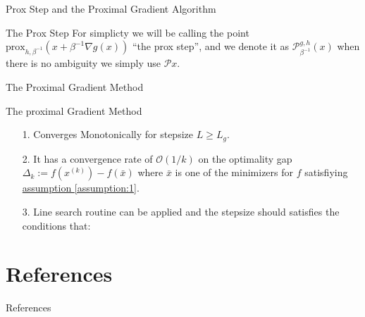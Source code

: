 \documentclass[11pt]{beamer}
\begin{document}
    \begin{frame}{Prox Step and the Proximal Gradient Algorithm}
        \begin{block}{The Prox Step}
            For simplicty we will be calling the point $\text{prox}_{h, \beta^{-1}}(x + \beta^{-1}\nabla g(x))$ ``the prox step'', and we denote it as $\mathcal P_{\beta^{-1}}^{g, h}(x)$ when there is no ambiguity we simply use $\mathcal Px$.     
        \end{block}
        \begin{block}{The Proximal Gradient Method}
            \begin{algorithm}[H]
                \scriptsize
                \begin{algorithmic}[1]
                    \ENDIF
                \ENDFOR
                \end{algorithmic}
                \caption{Proximal Gradient With Fixed Step-sizes}
                \label{alg:1}
            \end{algorithm}
        \end{block}
    \end{frame}
    \begin{frame}{The proximal Gradient Method}
        \begin{itemize}
            \item [1.] Converges Monotonically for stepsize $L \ge L_g$. 
            \item [2.] It has a convergence rate of $\mathcal O(1/k)$ on the optimality gap $\Delta_k := f(x^{(k)}) - f(\bar x)$ where $\bar x$ is one of the minimizers for $f$ satisfiying \hyperref[assumption:1]{assumption \ref*{assumption:1}}. 
            \item [3.] Line search routine can be applied and the stepsize should satisfies the conditions that: 
        \end{itemize}
    \end{frame}


   

\section{References}
    \begin{frame}{References}
        
    \end{frame}
\end{document}
